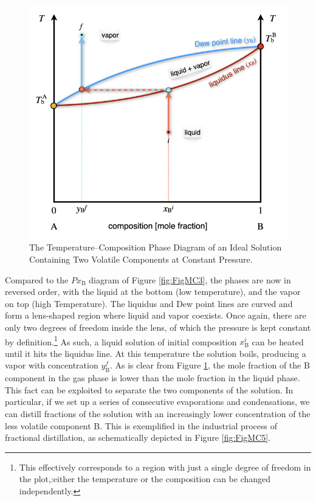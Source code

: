 \documentclass[
  9pt,
]{extbook}
\theoremstyle{definition}
\theoremstyle{definition}
\theoremstyle{definition}
\theoremstyle{definition}
\theoremstyle{remark}
\begin{document}
\begin{figure}

{\centering \includegraphics[width=0.6\linewidth]{./img/OEP_Figures.022} 

}

\caption{The Temperature–Composition Phase Diagram of an Ideal Solution Containing Two Volatile Components at Constant Pressure.}\label{fig:FigMC4}
\end{figure}

Compared to the \(Px_{\text{B}}\) diagram of Figure \ref{fig:FigMC3}, the phases are now in reversed order, with the liquid at the bottom (low temperature), and the vapor on top (high Temperature). The liquidus and Dew point lines are curved and form a lens-shaped region where liquid and vapor coexists. Once again, there are only two degrees of freedom inside the lens, of which the pressure is kept constant by definition.\footnote{This effectively corresponds to a region with just a single degree of freedom in the plot,:either the temperature or the composition can be changed independently.} As such, a liquid solution of initial composition \(x_{\text{B}}^i\) can be heated until it hits the liquidus line. At this temperature the solution boils, producing a vapor with concentration \(y_{\text{B}}^f\). As is clear from Figure \ref{fig:FigMC4}, the mole fraction of the \(\text{B}\) component in the gas phase is lower than the mole fraction in the liquid phase. This fact can be exploited to separate the two components of the solution. In particular, if we set up a series of consecutive evaporations and condensations, we can distill fractions of the solution with an increasingly lower concentration of the less volatile component \(\text{B}\). This is exemplified in the industrial process of fractional distillation, as schematically depicted in Figure \ref{fig:FigMC5}.
\end{document}
